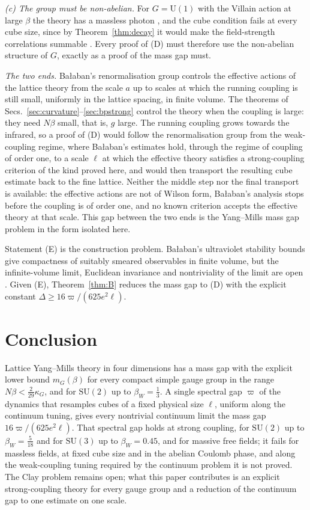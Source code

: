 \documentclass[11pt]{amsart}
\theoremstyle{definition}
\theoremstyle{remark}
\numberwithin{equation}{section}
\newcommand{\SU}{\mathrm{SU}}
\newcommand{\U}{\mathrm{U}}
\begin{document}
\emph{(c) The group must be non-abelian.} For $G=\U(1)$ with the Villain
action at large $\beta$ the theory has a massless photon \cite{FS82}, and the
cube condition fails at every cube size, since by Theorem~\ref{thm:decay} it
would make the field-strength correlations summable \cite{BBLRS26}. Every proof
of (D) must therefore use the non-abelian structure of $G$, exactly as a proof
of the mass gap must.

\emph{The two ends.} Ba{\l}aban's renormalisation group
\cite{Bal84a,Bal85a,Bal89b} controls the effective actions of the lattice
theory from the scale $a$ up to scales at which the running coupling is still
small, uniformly in the lattice spacing, in finite volume. The theorems of
Secs.~\ref{sec:curvature}--\ref{sec:bpstrong} control the theory when the
coupling is large: they need $N\beta$ small, that is, $g$ large. The running
coupling grows towards the infrared, so a proof of (D) would follow the
renormalisation group from the weak-coupling regime, where Ba{\l}aban's
estimates hold, through the regime of coupling of order one, to a scale
$\ell$ at which the effective theory satisfies a strong-coupling criterion of
the kind proved here, and would then transport the resulting cube estimate
back to the fine lattice. Neither the middle step nor the final transport is
available: the effective actions are not of Wilson form, Ba{\l}aban's analysis
stops before the coupling is of order one, and no known criterion accepts the
effective theory at that scale. This gap between the two ends is the Yang--Mills
mass gap problem in the form isolated here.

Statement (E) is the construction problem. Ba{\l}aban's ultraviolet stability
bounds give compactness of suitably smeared observables in finite volume, but
the infinite-volume limit, Euclidean invariance and nontriviality of the limit
are open \cite{JW06}. Given (E), Theorem~\ref{thm:B} reduces the mass gap to
(D) with the explicit constant $\Delta\ge16\varpi/(625e^2\ell)$.

\section{Conclusion}\label{sec:conclusion}

Lattice Yang--Mills theory in four dimensions has a mass gap with the explicit
lower bound $m_G(\beta)$ for every compact simple gauge group in the range
$N\beta<\frac2{29}\kappa_G$, and for $\SU(2)$ up to $\beta_W=\frac13$. A single
spectral gap $\varpi$ of the dynamics that resamples cubes of a fixed physical
size $\ell$, uniform along the continuum tuning, gives every nontrivial
continuum limit the mass gap $16\varpi/(625e^2\ell)$. That spectral gap holds
at strong coupling, for $\SU(2)$ up to $\beta_W=\frac5{18}$ and for $\SU(3)$ up
to $\beta_W=0.45$, and for massive free fields; it fails for massless fields,
at fixed cube size and in the abelian Coulomb phase, and along the weak-coupling
tuning required by the continuum problem it is not proved. The Clay problem
remains open; what this paper contributes is an explicit strong-coupling
theory for every gauge group and a reduction of the continuum gap to one
estimate on one scale.
\end{document}
